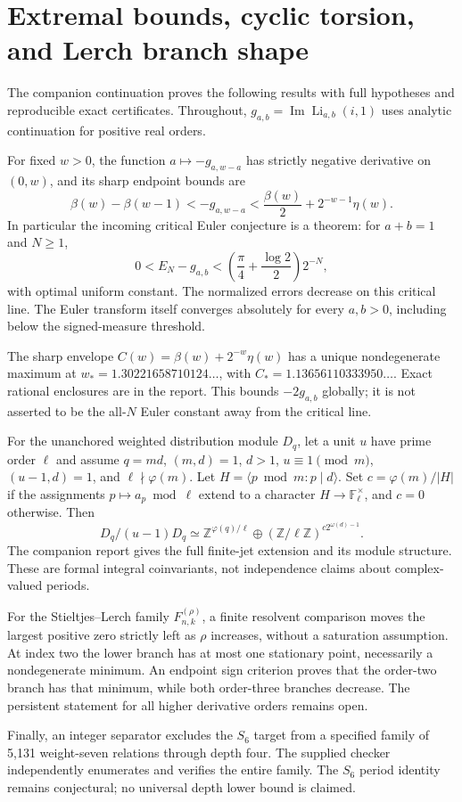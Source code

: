 \section{Extremal bounds, cyclic torsion, and Lerch branch shape}
\label{extremal20261010:overview}

The companion continuation \cite{extremal20261010} proves the following
results with full hypotheses and reproducible exact certificates.
Throughout, $g_{a,b}=\operatorname{Im}\operatorname{Li}_{a,b}(i,1)$ uses
analytic continuation for positive real orders.

For fixed $w>0$, the function $a\mapsto-g_{a,w-a}$ has strictly negative
derivative on $(0,w)$, and its sharp endpoint bounds are
\[
 \beta(w)-\beta(w-1)<-g_{a,w-a}
 <\frac{\beta(w)}2+2^{-w-1}\eta(w).
\]
In particular the incoming critical Euler conjecture is a theorem:
for $a+b=1$ and $N\ge1$,
\[
 0<E_N-g_{a,b}<\left(\frac\pi4+\frac{\log2}{2}\right)2^{-N},
\]
with optimal uniform constant. The normalized errors decrease on this
critical line. The Euler transform itself converges absolutely for
every $a,b>0$, including below the signed-measure threshold.

The sharp envelope $C(w)=\beta(w)+2^{-w}\eta(w)$ has a unique
nondegenerate maximum at $w_*=1.30221658710124\ldots$, with
$C_*=1.13656110333950\ldots$. Exact rational enclosures are in the
report. This bounds $-2g_{a,b}$ globally; it is not asserted to be the
all-$N$ Euler constant away from the critical line.

For the unanchored weighted distribution module $D_q$, let a unit $u$
have prime order $\ell$ and assume $q=md$, $(m,d)=1$, $d>1$,
$u\equiv1\pmod m$, $(u-1,d)=1$, and $\ell\nmid\varphi(m)$.
Let $H=\langle p\bmod m:p\mid d\rangle$. Set
$c=\varphi(m)/|H|$ if the assignments
$p\mapsto a_p\bmod\ell$ extend to a character
$H\to\mathbb F_\ell^\times$, and $c=0$ otherwise. Then
\[
 D_q/(u-1)D_q\simeq\mathbb Z^{\varphi(q)/\ell}
  \oplus(\mathbb Z/\ell\mathbb Z)^{c2^{\omega(d)-1}}.
\]
The companion report gives the full finite-jet extension and its
module structure. These are formal integral coinvariants, not
independence claims about complex-valued periods.

For the Stieltjes--Lerch family $F_{n,k}^{(\rho)}$, a finite resolvent
comparison moves the largest positive zero strictly left as $\rho$
increases, without a saturation assumption. At index two the lower
branch has at most one stationary point, necessarily a nondegenerate
minimum. An endpoint sign criterion proves that the order-two branch
has that minimum, while both order-three branches decrease. The
persistent statement for all higher derivative orders remains open.

Finally, an integer separator excludes the $S_6$ target from a specified
family of 5,131 weight-seven relations through depth four. The supplied
checker independently enumerates and verifies the entire family.
The $S_6$ period identity remains conjectural; no universal depth
lower bound is claimed.
